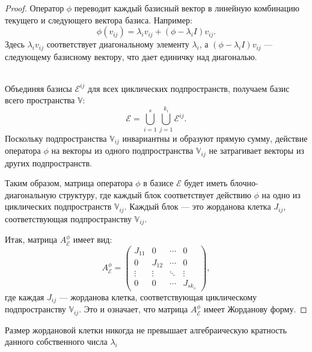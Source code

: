 \begin{proof}
    Оператор \( \phi \) переводит каждый базисный вектор в линейную комбинацию текущего и следующего вектора базиса. Например:
    \[
    \phi(v_{ij}) = \lambda_{i} v_{ij} + (\phi - \lambda_{i} I) v_{ij}.
    \]
    Здесь \( \lambda_{i} v_{ij} \) соответствует диагональному элементу \( \lambda_{i} \), а \( (\phi - \lambda_{i} I) v_{ij} \) — следующему базисному вектору, что дает единичку над диагональю.

\\

    Объединяя базисы \( \mathcal{E}^{ij} \) для всех циклических подпространств, получаем базис всего пространства \( \mathbb{V} \):
    \[
    \mathcal{E} = \bigcup_{i=1}^{s} \bigcup_{j=1}^{k_{i}} \mathcal{E}^{ij}.
    \]
    Поскольку подпространства \( \mathbb{V}_{ij} \) инвариантны и образуют прямую сумму, действие оператора \( \phi \) на векторы из одного подпространства \( \mathbb{V}_{ij} \) не затрагивает векторы из других подпространств. 

Таким образом, матрица оператора \( \phi \) в базисе \( \mathcal{E} \) будет иметь блочно-диагональную структуру, где каждый блок соответствует действию \( \phi \) на одно из циклических подпространств \( \mathbb{V}_{ij} \). Каждый блок — это жорданова клетка \( J_{ij} \), соответствующая подпространству \( \mathbb{V}_{ij} \).

Итак, матрица \( A_{\mathcal{E}}^{\phi} \) имеет вид:
    \[
    A_{\mathcal{E}}^{\phi} = \begin{pmatrix}
        J_{11} & 0 & \cdots & 0 \\
        0 & J_{12} & \cdots & 0 \\
        \vdots & \vdots & \ddots & \vdots \\
        0 & 0 & \cdots & J_{sk_{s}}
    \end{pmatrix},
    \]
    где каждая \( J_{ij} \) — жорданова клетка, соответствующая циклическому подпространству \( \mathbb{V}_{ij} \). Это и означает, что матрица \( A_{\mathcal{E}}^{\phi} \) имеет Жорданову форму.
\end{proof}


\begin{shcor}
    \begin{corollary}
        \leavevmode \nl 
        
        Размер жордановой клетки никогда не превышает алгебраическую кратность \\данного собственного числа $\lambda_{i}$
    \end{corollary}
\end{shcor}

